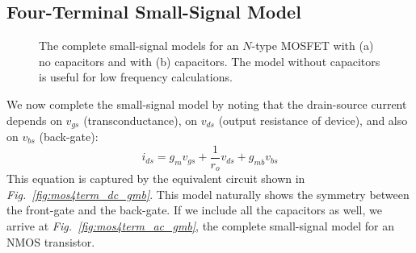 \subsection{Four-Terminal Small-Signal Model}
\begin{figure}[tb]
\centering
{}
\caption{The complete small-signal models for an $N$-type MOSFET with (a) no capacitors and with (b) capacitors.  The model without capacitors is useful for low frequency calculations.} 
\end{figure}
We now complete the small-signal model by noting that the drain-source current depends on $v_{gs}$ (transconductance), on $v_{ds}$ (output resistance of device), and also on $v_{bs}$ (back-gate):
    \begin{equation}
        {i_{ds}} = {g_m}{v_{gs}} + \frac{1}{{{r_o}}}{v_{ds}} + {g_{mb}}{v_{bs}} 
    \end{equation}
This equation is captured by the equivalent circuit shown in \emph{Fig.~\ref{fig:mos4term_dc_gmb}}.  This model naturally shows the symmetry between the front-gate and the back-gate.  If we include all the capacitors as well, we arrive at \emph{Fig.~\ref{fig:mos4term_ac_gmb}}, the complete small-signal model for an NMOS transistor.
